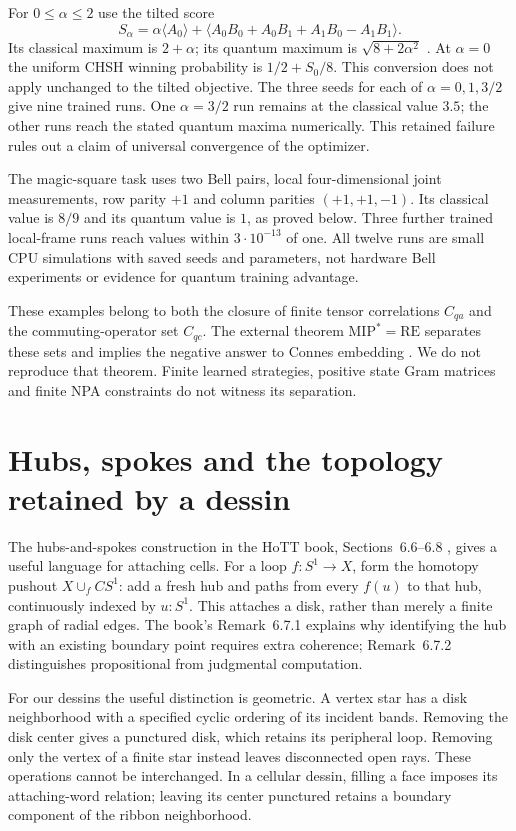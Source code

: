 \documentclass[11pt]{article}
\theoremstyle{definition}\newtheorem{definition}[theorem]{Definition}
\theoremstyle{remark}\newtheorem{remark}[theorem]{Remark}
\begin{document}
For $0\le\alpha\le2$ use the tilted score
\[
 S_\alpha=\alpha\langle A_0\rangle+
 \langle A_0B_0+A_0B_1+A_1B_0-A_1B_1\rangle.
\]
Its classical maximum is $2+\alpha$; its quantum maximum is
$\sqrt{8+2\alpha^2}$ \cite{GameTilted}. At $\alpha=0$ the uniform CHSH winning
probability is $1/2+S_0/8$. This conversion does not apply unchanged to the
tilted objective. The three seeds for each of $\alpha=0,1,3/2$ give nine
trained runs. One $\alpha=3/2$ run remains at the classical value $3.5$;
the other runs reach the stated quantum maxima numerically. This retained
failure rules out a claim of universal convergence of the optimizer.

The magic-square task uses two Bell pairs, local four-dimensional joint
measurements, row parity $+1$ and column parities $(+1,+1,-1)$. Its classical
value is $8/9$ and its quantum value is $1$, as proved below. Three further
trained local-frame runs reach values within $3\cdot10^{-13}$ of one.
All twelve runs are small CPU simulations with saved seeds and parameters,
not hardware Bell experiments or evidence for quantum training advantage.

These examples belong to both the closure of finite tensor correlations
$C_{qa}$ and the commuting-operator set $C_{qc}$. The external theorem
$\mathrm{MIP}^*=\mathrm{RE}$ separates these sets and implies the negative
answer to Connes embedding \cite{GameMIP}. We do not reproduce that theorem.
Finite learned strategies, positive state Gram matrices and finite NPA
constraints do not witness its separation.

\section{Hubs, spokes and the topology retained by a dessin}
\label{hs:section}
The hubs-and-spokes construction in the HoTT book, Sections~6.6--6.8
\cite{HubsSpokes}, gives a useful language for attaching cells. For a loop
$f:S^1\to X$, form the homotopy pushout
$X\cup_f CS^1$: add a fresh hub and paths from every $f(u)$ to that hub,
continuously indexed by $u:S^1$. This attaches a disk, rather than merely a
finite graph of radial edges. The book's Remark~6.7.1 explains why identifying
the hub with an existing boundary point requires extra coherence;
Remark~6.7.2 distinguishes propositional from judgmental computation.

For our dessins the useful distinction is geometric. A vertex star has a
disk neighborhood with a specified cyclic ordering of its incident bands.
Removing the disk center gives a punctured disk, which retains its peripheral
loop. Removing only the vertex of a finite star instead leaves disconnected
open rays. These operations cannot be interchanged. In a cellular dessin,
filling a face imposes its attaching-word relation; leaving its center
punctured retains a boundary component of the ribbon neighborhood.
\end{document}
